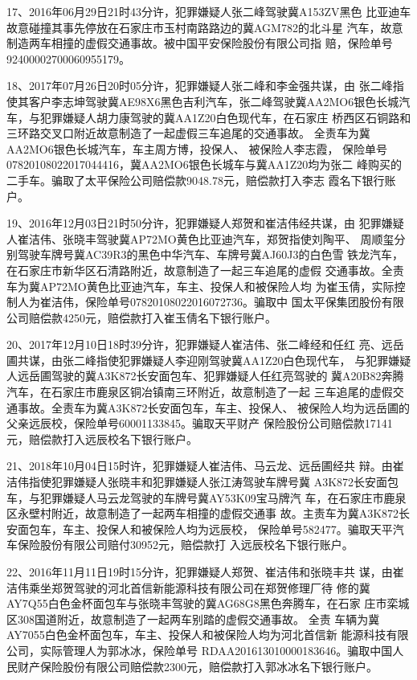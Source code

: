 17、2016年06月29日21时43分许，犯罪嫌疑人张二峰驾驶冀A153ZV黑色
比亚迪车故意碰撞其事先停放在石家庄市玉村南路路边的冀AGM782的北斗星
汽车，故意制造两车相撞的虚假交通事故。被中国平安保险股份有限公司指
赔，保险单号92400002700060955179。

18、2017年07月26日20时05分许，犯罪嫌疑人张二峰和李金强共谋，由
张二峰指使其客户李志坤驾驶冀AE98X6黑色吉利汽车，张二峰驾驶冀AA2MO6银色长城汽车，与犯罪嫌疑人胡力康驾驶的冀AA1Z20白色现代车，在石家庄
桥西区石铜路和三环路交叉口附近故意制造了一起虚假三车追尾的交通事故。
全责车为冀AA2MO6银色长城汽车，车主周方博，投保人、 被保险人李志霞，
保险单号07820108022017044416，冀AA2MO6银色长城车与冀AA1Z20均为张二
峰购买的二手车。骗取了太平保险公司赔偿款9048.78元，赔偿款打入李志
霞名下银行账户。

19、2016年12月03日21时50分许，犯罪嫌疑人郑贺和崔洁伟经共谋，由
犯罪嫌疑人崔洁伟、张晓丰驾驶冀AP72MO黄色比亚迪汽车，郑贺指使刘陶平、
周顺玺分别驾驶车牌号冀AC39R3的黑色中华汽车、车牌号冀AJ60J3的白色雪
铁龙汽车，在石家庄市新华区石清路附近，故意制造了一起三车追尾的虚假
交通事故。全责车为冀AP72MO黄色比亚迪汽车，车主、投保人和被保险人均
为崔玉倩，实际控制人为崔洁伟，保险单号07820108022016072736。骗取中
国太平保集团股份有限公司赔偿款4250元，赔偿款打入崔玉倩名下银行账户。

20、2017年12月10日18时39分许，犯罪嫌疑人崔洁伟、张二峰经和任红
亮、远岳圃共谋，由张二峰指使犯罪嫌疑人李迎刚驾驶冀AA1Z20白色现代车，
与犯罪嫌疑人远岳圃驾驶的冀A3K872长安面包车、犯罪嫌疑人任红亮驾驶的
冀A20B82奔腾汽车，在石家庄市鹿泉区铜冶镇南三环附近，故意制造了一起
三车追尾的虚假交通事故。全责车为冀A3K872长安面包车，车主、投保人、
被保险人均为远岳圃的父亲远辰校，保险单号60001133845。骗取天平财产
保险股份公司赔偿款17141元，赔偿款打入远辰校名下银行账户。

21、2018年10月04日15时许，犯罪嫌疑人崔洁伟、马云龙、远岳圃经共
辩。由崔洁伟指使犯罪嫌疑人张晓丰和犯罪嫌疑人张江涛驾驶车牌号冀
A3K872长安面包车，与犯罪嫌疑人马云龙驾驶的车牌号冀AY53K09宝马牌汽
车，在石家庄市鹿泉区永壁村附近，故意制造了一起两车相撞的虚假交通事
故。主责车为冀A3K872长安面包车，车主、投保人和被保险人均为远辰校，
保险单号582477。骗取天平汽车保险股份有限公司赔付30952元，赔偿款打
入远辰校名下银行账户。

22、2016年11月11日19时15分许，犯罪嫌疑人郑贺、崔洁伟和张晓丰共
谋，由崔洁伟乘坐郑贺驾驶的河北首信新能源科技有限公司在郑贺修理厂待
修的冀AY7Q55白色金杯面包车与张晓丰驾驶的冀AG68G8黑色奔腾车，在石家
庄市栾城区308国道附近，故意制造了一起两车别踏的虚假交通事故。 全责
车辆为冀AY7055白色金杯面包车，车主、投保人和被保险人均为河北首信新
能源科技有限公司，实际管理人为郭冰冰，保险单号
RDAA201613010000183646。骗取中国人民财产保险股份有限公司赔偿款2300元，赔偿款打入郭冰冰名下银行账户。

